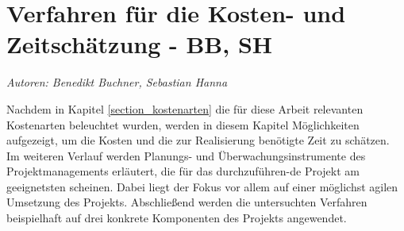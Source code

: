 \section{Verfahren für die Kosten- und Zeitschätzung - BB, SH}
\textit{Autoren: Benedikt Buchner, Sebastian Hanna}

\label{section_verfahren_schaetzung}
Nachdem in Kapitel \ref{section_kostenarten} die für diese Arbeit relevanten Kostenarten 
beleuchtet wurden, werden in diesem Kapitel Möglichkeiten aufgezeigt, um die Kosten 
und die zur Realisierung benötigte Zeit zu schätzen. Im weiteren Verlauf werden 
Planungs- und Überwachungsinstrumente des Projektmanagements erläutert, die für 
das durchzuführen-de Projekt am geeignetsten scheinen. Dabei liegt der Fokus vor 
allem auf einer möglichst agilen Umsetzung des Projekts. Abschließend werden 
die untersuchten Verfahren beispielhaft auf drei konkrete Komponenten des Projekts 
angewendet.





